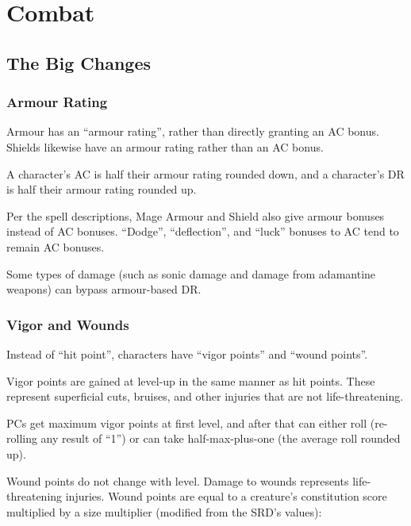 
\chapter{Combat}
\label{sect-combat}

%
%
\section{The Big Changes}

%
\subsection{Armour Rating}

Armour has an ``armour rating'', rather than directly granting an AC bonus.
Shields likewise have an armour rating rather than an AC bonus.

A character's AC is half their armour rating rounded down, and a
character's DR is half their armour rating rounded up.

Per the spell descriptions, Mage Armour and Shield also give armour bonuses
instead of AC bonuses. ``Dodge'', ``deflection'', and ``luck'' bonuses to
AC tend to remain AC bonuses.

Some types of damage (such as sonic damage and damage from adamantine
weapons) can bypass armour-based DR.

%
\subsection{Vigor and Wounds}

Instead of ``hit point'', characters have ``vigor points'' and ``wound
points''.

Vigor points are gained at level-up in the same manner as hit points. These
represent superficial cuts, bruises, and other injuries that are not
life-threatening.

PCs get maximum vigor points at first level, and after that can either roll
(re-rolling any result of ``1'') or can take half-max-plus-one (the
average roll rounded up).

Wound points do not change with level. Damage to wounds represents
life-threatening injuries. Wound points are equal to a creature's
constitution score multiplied by a size multiplier (modified from the SRD's
values):

